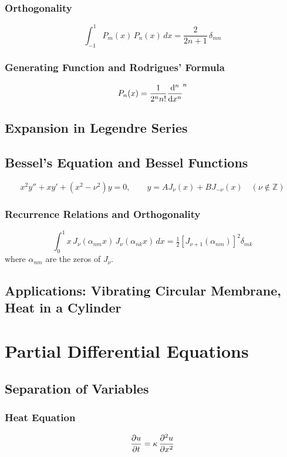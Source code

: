 \documentclass[11pt, letterpaper]{article}
\theoremstyle{plain}
\begin{document}
\subsubsection*{Orthogonality}
\[
  \int_{-1}^{1} P_m(x)\,P_n(x)\,dx = \frac{2}{2n+1}\,\delta_{mn}
\]

\subsubsection*{Generating Function and Rodrigues' Formula}
\[
  P_n(x) = \frac{1}{2^n n!}\dv[n]{}{x}(x^2-1)^n
\]

\subsection{Expansion in Legendre Series}

\subsection{Bessel's Equation and Bessel Functions}
\[
  x^2 y'' + xy' + (x^2 - \nu^2)y = 0, \qquad
  y = AJ_\nu(x) + BJ_{-\nu}(x) \quad (\nu \notin \mathbb{Z})
\]

\subsubsection*{Recurrence Relations and Orthogonality}
\[
  \int_0^1 x\,J_\nu(\alpha_{nm} x)\,J_\nu(\alpha_{nk} x)\,dx
  = \tfrac{1}{2}[J_{\nu+1}(\alpha_{nm})]^2 \delta_{mk}
\]
where $\alpha_{nm}$ are the zeros of $J_\nu$.

\subsection{Applications: Vibrating Circular Membrane, Heat in a Cylinder}


\section{Partial Differential Equations}  %

\subsection{Separation of Variables}

\subsubsection*{Heat Equation}
\[
  \pdv{u}{t} = \kappa\,\pdv[2]{u}{x}
\]
\end{document}
